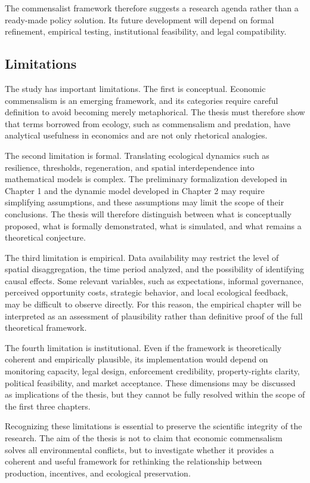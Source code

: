 The commensalist framework therefore suggests a research agenda rather than a ready-made policy solution. Its future development will depend on formal refinement, empirical testing, institutional feasibility, and legal compatibility.

\subsection{Limitations}

The study has important limitations. The first is conceptual. Economic commensalism is an emerging framework, and its categories require careful definition to avoid becoming merely metaphorical. The thesis must therefore show that terms borrowed from ecology, such as commensalism and predation, have analytical usefulness in economics and are not only rhetorical analogies.

The second limitation is formal. Translating ecological dynamics such as resilience, thresholds, regeneration, and spatial interdependence into mathematical models is complex. The preliminary formalization developed in Chapter 1 and the dynamic model developed in Chapter 2 may require simplifying assumptions, and these assumptions may limit the scope of their conclusions. The thesis will therefore distinguish between what is conceptually proposed, what is formally demonstrated, what is simulated, and what remains a theoretical conjecture.

The third limitation is empirical. Data availability may restrict the level of spatial disaggregation, the time period analyzed, and the possibility of identifying causal effects. Some relevant variables, such as expectations, informal governance, perceived opportunity costs, strategic behavior, and local ecological feedback, may be difficult to observe directly. For this reason, the empirical chapter will be interpreted as an assessment of plausibility rather than definitive proof of the full theoretical framework.

The fourth limitation is institutional. Even if the framework is theoretically coherent and empirically plausible, its implementation would depend on monitoring capacity, legal design, enforcement credibility, property-rights clarity, political feasibility, and market acceptance. These dimensions may be discussed as implications of the thesis, but they cannot be fully resolved within the scope of the first three chapters.

Recognizing these limitations is essential to preserve the scientific integrity of the research. The aim of the thesis is not to claim that economic commensalism solves all environmental conflicts, but to investigate whether it provides a coherent and useful framework for rethinking the relationship between production, incentives, and ecological preservation.

\newpage

